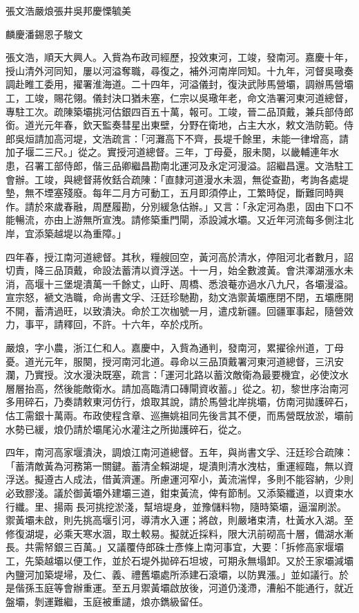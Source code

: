 
\begin{pinyinscope}
張文浩嚴烺張井吳邦慶慄毓美

麟慶潘錫恩子駿文

張文浩，順天大興人。入貲為布政司經歷，投效東河，工竣，發南河。嘉慶十年，授山清外河同知，屢以河溢奪職，尋復之，補外河南岸同知。十九年，河督吳璥奏調赴睢工委用，擢署淮海道。二十四年，河溢儀封，復決武陟馬營壩，調辦馬營壩工，工竣，賜花翎。儀封決口猶未塞，仁宗以吳璥年老，命文浩署河東河道總督，專駐工次。疏陳築壩挑河估銀四百五十萬，報可。工竣，晉二品頂戴，兼兵部侍郎銜。道光元年春，欽天監奏彗星出東壁，分野在衛地，占主大水，敕文浩防範。侍郎吳烜請加高河堤，文浩疏言：「河灘高下不齊，長堤千餘里，未能一律增高，請加子堰二三尺。」從之。實授河道總督。三年，丁母憂，服未闋，以畿輔連年水患，召署工部侍郎，偕三品卿繼昌勘南北運河及永定河漫溢。詔繼昌還。文浩駐工會辦。工竣，與總督蔣攸銛合疏陳：「直隸河道漫水未涸，無從查勘，考詢各處堤墊，無不堙塞殘廢。每年二月方可動工，五月即須停止，工繁時促，斷難同時興作。請於來歲春融，周歷履勘，分別緩急估辦。」又言：「永定河為患，固由下口不能暢流，亦由上游無所宣洩。請修築重門閘，添設減水壩。又近年河流每多側注北岸，宜添築越堤以為重障。」

四年春，授江南河道總督。其秋，糧艘回空，黃河高於清水，停阻河北者數月，詔切責，降三品頂戴，命設法蓄清以資浮送。十一月，始全數渡黃。會洪澤湖漲水未消，高堰十三堡堤潰萬一千餘丈，山盱、周橋、悉浪菴亦過水八九尺，各壩漫溢。宣宗怒，褫文浩職，命尚書文孚、汪廷珍馳勘，劾文浩禦黃壩應閉不閉，五壩應開不開，蓄清過旺，以致潰決。命於工次枷號一月，遣戍新疆。回疆軍事起，隨營效力，事平，請釋回，不許。十六年，卒於戍所。

嚴烺，字小農，浙江仁和人。嘉慶中，入貲為通判，發南河，累擢徐州道，丁母憂。道光元年，服闋，授河南河北道。尋命以三品頂戴署河東河道總督，三汛安瀾，乃實授。汶水漫決既塞，疏言：「運河北路以蓄汶敵衛為最要機宜，必使汶水層層抬高，然後能敵衛水。請加高臨清口磚閘資收蓄。」從之。初，黎世序治南河多用碎石，乃奏請敕東河仿行，烺取其說，請於馬營北岸挑壩，仿南河拋護碎石，估工需銀十萬兩。布政使程含章、巡撫姚祖同先後言其不便，而馬營既放淤，壩前水勢已緩，烺仍請於壩尾沁水灌注之所拋護碎石，從之。

四年，南河高家堰潰決，調烺江南河道總督。五年，與尚書文孚、汪廷珍合疏陳：「蓄清敵黃為河務第一關鍵。蓄清全賴湖堤，堤潰則清水洩枯，重運經臨，無以資浮送。擬遵古人成法，借黃濟運。所慮運河窄小，黃流湍悍，多則不能容納，少則必致膠淺。議於御黃壩外建壩三道，鉗束黃流，俾有節制。又添築纖道，以資束水行纖。里、揚兩長河挑挖淤淺，幫培堤身，並豫儲料物，隨時築壩，逼溜刷淤。禦黃壩未啟，則先挑高堰引河，導清水入運；將啟，則嚴堵束清，杜黃水入湖。至修復湖堤，必乘天寒水涸，取土較易。擬就近採料，限大汛前砌高十層，備湖水漸長。共需帑銀三百萬。」又議覆侍郎硃士彥條上南河事宜，大要：「拆修高家堰壩工，先築越壩以便工作，並於石堤外拋碎石坦坡，可期永無塌卸。又於王家壩減壩內鹽河加築堤埽，及仁、義、禮舊壩處所添建石滾壩，以防異漲。」並如議行。於是偕孫玉庭等會辦重運。至五月禦黃壩啟放後，河道仍淺滯，漕船不能通行，就近盤壩，剝運難繼，玉庭被重譴，烺亦鐫級留任。


\end{pinyinscope}
